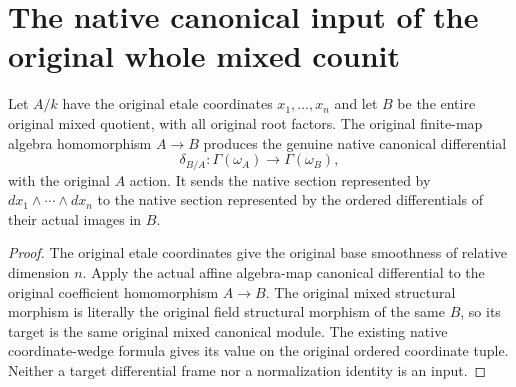 \section{The native canonical input of the original whole mixed counit}

\begin{lemma}
\label{lem:kn-nadel-mixed-original-native-canonical-input}
\leanok
{}
Let $A/k$ have the original etale coordinates $x_1,\ldots,x_n$ and
let $B$ be the entire original mixed quotient, with all original root
factors. The original finite-map algebra homomorphism $A\to B$
produces the genuine native canonical differential
\[
 \delta_{B/A}:\Gamma(\omega_A)\longrightarrow\Gamma(\omega_B),
\]
with the original $A$ action. It sends the native section represented
by $dx_1\wedge\cdots\wedge dx_n$ to the native section represented
by the ordered differentials of their actual images in $B$.
\end{lemma}
\begin{proof}
The original etale coordinates give the original base smoothness of
relative dimension $n$. Apply the actual affine algebra-map canonical
differential to the original coefficient homomorphism $A\to B$.
The original mixed structural morphism is literally the original
field structural morphism of the same $B$, so its target is the same
original mixed canonical module. The existing native coordinate-wedge
formula gives its value on the original ordered coordinate tuple.
Neither a target differential frame nor a normalization identity is
an input.
\end{proof}
